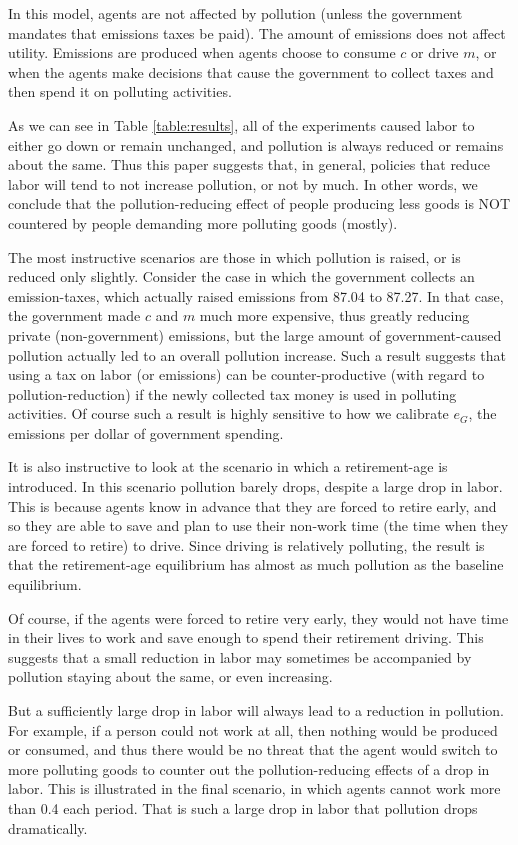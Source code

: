 \documentclass[letter, 12pt, epsf,leqno]{article}
\begin{document}
In this model, agents are not affected by pollution (unless the government mandates that emissions taxes be paid).  The amount of emissions does not affect utility.  Emissions are produced when agents choose to consume $c$ or drive $m$, or when the agents make decisions that cause the government to collect taxes and then spend it on polluting activities.

As we can see in Table \ref{table:results}, all of the experiments caused labor to either go down or remain unchanged, and pollution is always reduced or remains about the same.  Thus this paper suggests that, in general, policies that reduce labor will tend to not increase pollution, or not by much.  In other words, we conclude that the pollution-reducing effect of people producing less goods is NOT countered by people demanding more polluting goods (mostly).

The most instructive scenarios are those in which pollution is raised, or is reduced only slightly.  Consider the case in which the government collects an emission-taxes, which actually raised emissions from 87.04 to 87.27.  In that case, the government made $c$ and $m$ much more expensive, thus greatly reducing private (non-government) emissions, but the large amount of government-caused pollution actually led to an overall pollution increase.  Such a result suggests that using a tax on labor (or emissions) can be counter-productive (with regard to pollution-reduction) if the newly collected tax money is used in polluting activities.  Of course such a result is highly sensitive to how we calibrate $e_G$, the emissions per dollar of government spending.

It is also instructive to look at the scenario in which a retirement-age is introduced.  In this scenario pollution barely drops, despite a large drop in labor.  This is because agents know in advance that they are forced to retire early, and so they are able to save and plan to use their non-work time (the time when they are forced to retire) to drive.  Since driving is relatively polluting, the result is that the retirement-age equilibrium has almost as much pollution as the baseline equilibrium.

Of course, if the agents were forced to retire very early, they would not have time in their lives to work and save enough to spend their retirement driving.  This suggests that a small reduction in labor may sometimes be accompanied by pollution staying about the same, or even increasing.  

But a sufficiently large drop in labor will always lead to a reduction in pollution.  For example, if a person could not work at all, then nothing would be produced or consumed, and thus there would be no threat that the agent would switch to more polluting goods to counter out the pollution-reducing effects of a drop in labor.  This is illustrated in the final scenario, in which agents cannot work more than 0.4 each period.  That is such a large drop in labor that pollution drops dramatically.
\end{document}

